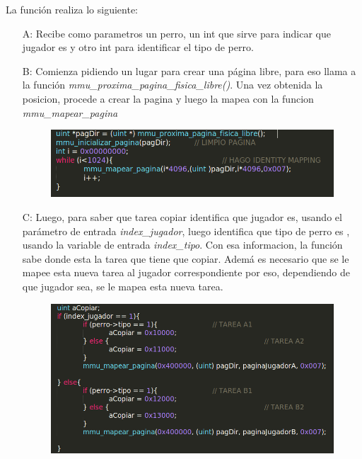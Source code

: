 La función realiza lo siguiente: 

\begin{itemize}

	\item[A:] Recibe como parametros un perro, un int que sirve para indicar que jugador es y otro int para identificar el tipo de perro.

	\item[B:] Comienza pidiendo un lugar para crear una página libre, para eso llama a la función \textit{mmu\_proxima\_pagina\_fisica\_libre()}. Una vez obtenida la posicion, procede a crear la pagina y luego la mapea con la funcion \textit{mmu\_mapear\_pagina}

	\begin{figure}[H]
	\begin{center}
	\includegraphics[width=\linewidth]{ejercicio4/fun1}
	\caption{{\small } }
	\endminipage
	\end{center}
	\end{figure}

	\item[C:]  Luego, para saber que tarea copiar identifica que jugador es, usando el parámetro de entrada \textit{index\_jugador}, luego identifica que tipo de perro es , usando la variable de entrada \textit{index\_tipo}. Con esa informacion, la función sabe donde esta la tarea que tiene que copiar. Ademá es necesario que se le mapee esta nueva tarea al jugador correspondiente por eso, dependiendo de que jugador sea, se le mapea esta nueva tarea.
	 
	\begin{figure}[H]
	\begin{center}
	\includegraphics[width=\linewidth]{ejercicio4/fun2}
	\caption{{\small } }
	\endminipage
	\end{center}
	\end{figure}


\end{itemize}
